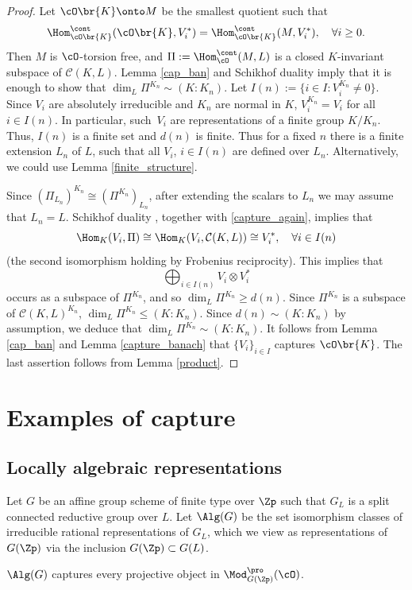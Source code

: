 \begin{proof} Let $\cO\br{K}\onto M$ be the smallest quotient such that
\begin{equation}\label{capture_again}
\Hom^{\cont}_{\cO\br{K}}(\cO\br{K}, V_i^*)=\Hom^{\cont}_{\cO\br{K}}(M, V_i^*),\quad \forall i\ge 0.
\end{equation}
Then $M$ is $\cO$-torsion free, and $\Pi:=\Hom_{\cO}^{\cont}(M, L)$ is a closed $K$-invariant subspace of $\mathcal C(K, L)$. Lemma \ref{cap_ban} and Schikhof duality imply that it is enough
to show that $\dim_L \Pi^{K_n}\sim (K:K_n)$. Let $I(n):=\{i\in I: V_i^{K_n}\neq 0\}$.
Since $V_i$ are absolutely irreducible and $K_n$ are normal in $K$, $V_i^{K_n}=V_i$ for all $i\in I(n)$. In particular, such~$V_i$ are representations of a finite group $K/K_n$. Thus, $I(n)$ is a finite set and $d(n)$ is finite.
Thus for a fixed $n$ there is a finite extension $L_n$ of $L$, such that all $V_i$, $i\in I(n)$ are defined over $L_n$. Alternatively, we could use Lemma \ref{finite_structure}.

Since $(\Pi_{L_n})^{K_n}\cong (\Pi^{K_n})_{L_n}$,
after extending the scalars to $L_n$ we may assume that $L_n=L$.
Schikhof duality \cite[Th.\,3.5]{iw}, together with \eqref{capture_again},
implies that
\begin{equation}
\Hom_K(V_i, \Pi)\cong \Hom_K(V_i, \mathcal{C}(K, L)) \cong V_i^*, \quad \forall i\in I(n)
\end{equation}
(the second isomorphism holding by Frobenius reciprocity).
This implies that
\[
\bigoplus_{i\in I(n)} V_i\otimes V_i^*
\]
occurs as a subspace of $\Pi^{K_n}$, and so $\dim_L \Pi^{K_n}\ge d(n)$. Since $\Pi^{K_n}$ is a subspace of
$\mathcal C(K, L)^{K_n}$, $\dim_L \Pi^{K_n} \le (K:K_n)$. Since $d(n)\sim (K:K_n)$ by assumption, we deduce that $\dim_L \Pi^{K_n}\sim (K: K_n)$.
It follows from Lemma \ref{cap_ban} and Lemma \ref{capture_banach} that $\{V_i\}_{i\in I}$ captures $\cO\br{K}$. The last assertion follows from Lemma \ref{product}.
\end{proof}

\section{Examples of capture}\label{examples}

\subsection{Locally algebraic representations}
Let $G$ be an affine group scheme of finite type over $\Zp$ such that $G_L$ is a split connected reductive group over $L$. Let
$\Alg(G)$ be the set isomorphism classes of irreducible rational representations of $G_L$, which we view as representations of $G(\Zp)$ via the inclusion $G(\Zp)\subset G(L)$.
\begin{prop}\label{capture_algebraic} $\Alg(G)$ captures every projective object in $\Mod^{\pro}_{G(\Zp)}(\cO)$.
\end{prop}

